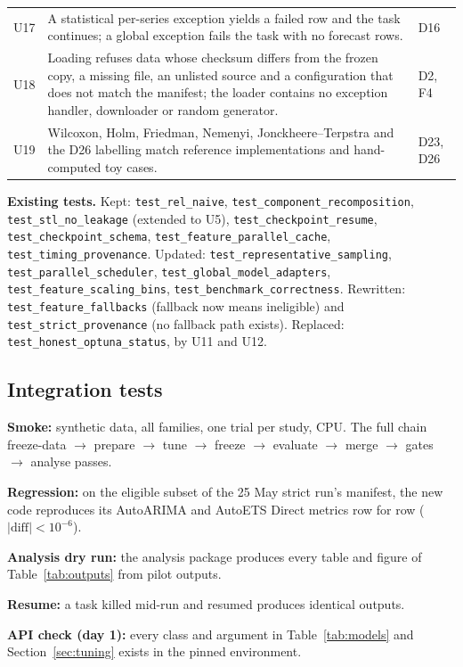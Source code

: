 \documentclass[11pt,a4paper]{article}
\newcommand{\code}[1]{\texttt{#1}}
\begin{document}
{\begin{longtable}{@{}p{0.7cm} p{10.8cm} p{3.6cm}@{}}
U17 & A statistical per-series exception yields a failed row and the task continues; a global exception fails the task with no forecast rows. & D16 \\
U18 & Loading refuses data whose checksum differs from the frozen copy, a missing file, an unlisted source and a configuration that does not match the manifest; the loader contains no exception handler, downloader or random generator. & D2, F4 \\
U19 & Wilcoxon, Holm, Friedman, Nemenyi, Jonckheere--Terpstra and the D26 labelling match reference implementations and hand-computed toy cases. & D23, D26 \\
\end{longtable}
}

{\sloppy\textbf{Existing tests.} Kept: \code{test_rel_naive}, \code{test_component_recomposition},
\code{test_stl_no_leakage} (extended to U5), \code{test_checkpoint_resume},
\code{test_checkpoint_schema}, \code{test_feature_parallel_cache}, \code{test_timing_provenance}.
Updated: \code{test_representative_sampling}, \code{test_parallel_scheduler},
\code{test_global_model_adapters}, \code{test_feature_scaling_bins}, \code{test_benchmark_correctness}.
Rewritten: \code{test_feature_fallbacks} (fallback now means ineligible) and
\code{test_strict_provenance} (no fallback path exists). Replaced: \code{test_honest_optuna_status},
by U11 and U12.\par}

\subsection{Integration tests}

\begin{description}[leftmargin=1.1cm,style=sameline,font=\normalfont\bfseries]
  \item[I1] \textbf{Smoke:} synthetic data, all families, one trial per study, CPU. The full chain
  freeze-data $\rightarrow$ prepare $\rightarrow$ tune $\rightarrow$ freeze $\rightarrow$ evaluate
  $\rightarrow$ merge $\rightarrow$ gates $\rightarrow$ analyse passes.
  \item[I2] \textbf{Regression:} on the eligible subset of the 25 May strict run's manifest, the new
  code reproduces its AutoARIMA and AutoETS Direct metrics row for row ($|\text{diff}| < 10^{-6}$).
  \item[I3] \textbf{Analysis dry run:} the analysis package produces every table and figure of
  Table~\ref{tab:outputs} from pilot outputs.
  \item[I4] \textbf{Resume:} a task killed mid-run and resumed produces identical outputs.
  \item[I5] \textbf{API check (day 1):} every class and argument in Table~\ref{tab:models} and
  Section~\ref{sec:tuning} exists in the pinned environment.
\end{description}
\end{document}
